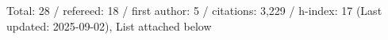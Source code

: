 Total: 28 / refereed: 18 / first author: 5 / citations: 3,229 / h-index: 17 (Last updated: 2025-09-02), List attached below
